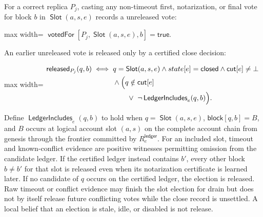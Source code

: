 \documentclass[sigplan,twocolumn,review,anonymous]{acmart}
\newcommand{\func}[1]{\operatorname{\mathsf{#1}}}
\newcommand{\Slot}{\func{Slot}}
\newcommand{\true}{\mathsf{true}}
\newcommand{\blockMap}{\mathsf{block}}
\newcommand{\votedFor}{\func{votedFor}}
\newcommand{\released}{\func{released}}
\newcommand{\closeCut}{\mathsf{cut}}
\begin{document}
For a correct replica \(P_j\), casting any non-timeout first, notarization, or final vote for block
\(b\) in \(\Slot(a,s,e)\) records a unreleased vote:
\begin{center}
\begin{adjustbox}{max width=\columnwidth}
\(\displaystyle
    \votedFor[P_j,\Slot(a,s,e),b]=\true.
\)
\end{adjustbox}
\end{center}
An earlier unreleased vote is released only by a certified close decision:
\begin{center}
\begin{adjustbox}{max width=\columnwidth}
\(\displaystyle
\begin{aligned}
\released_{P_j}(q,b)
\iff{}& q=\Slot(a,s,e)\wedge state[e]=\mathsf{closed}\wedge\closeCut[e]\neq\bot\\
&{}\wedge\Bigl(q\notin\closeCut[e]\\
&\qquad\vee\ \neg\func{LedgerIncludes}_e(q,b)\Bigr).
\end{aligned}
\)
\end{adjustbox}
\end{center}
Define \(\func{LedgerIncludes}_e(q,b)\) to hold when \(q=\Slot(a,s,e)\),
\(\blockMap[q,b]=B\), and \(B\) occurs at logical account slot \((a,s)\) on the complete account chain from
genesis through the frontier committed by \(R^{\mathsf{ledger}}_e\).  For an included slot, timeout
and known-conflict evidence are positive witnesses permitting omission from the candidate ledger.  If
the certified ledger instead contains \(b'\), every other block \(b\neq b'\) for that slot is
released even when its notarization certificate is learned later.  If no candidate of \(q\) occurs on
the certified ledger, the election is released.  Raw timeout or conflict evidence may finish the slot
election for drain but does not by itself release future conflicting votes while the close record is
unsettled.  A local belief that an election is stale, idle, or disabled is not release.
\end{document}
